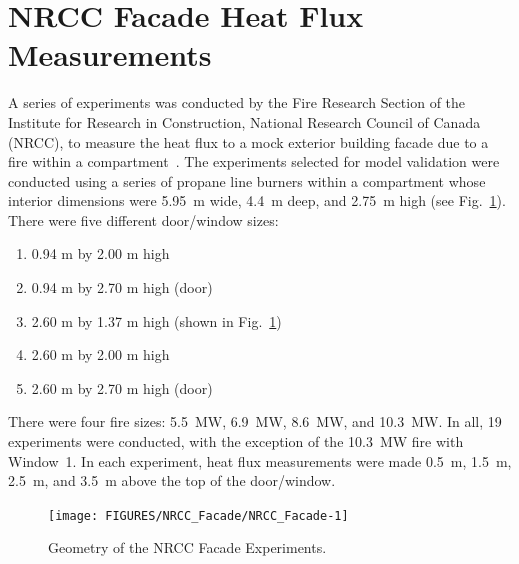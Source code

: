 \section{NRCC Facade Heat Flux Measurements}

A series of experiments was conducted by the Fire Research Section of the Institute for Research in Construction, National Research Council of Canada (NRCC),
to measure the heat flux to a mock exterior building facade due to a fire within a compartment~\cite{Oleszkiewicz:ASME,Oleszkiewicz:FireTech}. The experiments selected for model
validation were conducted using a series of propane line burners within a compartment whose interior dimensions were 5.95~m wide, 4.4~m deep, and 2.75~m high (see
Fig.~\ref{NRCC_Facade_Drawing}). There
were five different door/window sizes:
\begin{enumerate}
\item 0.94 m by 2.00 m high
\item 0.94 m by 2.70 m high (door)
\item 2.60 m by 1.37 m high (shown in Fig.~\ref{NRCC_Facade_Drawing})
\item 2.60 m by 2.00 m high
\item 2.60 m by 2.70 m high (door)
\end{enumerate}
There were four fire sizes: 5.5~MW, 6.9~MW, 8.6~MW, and 10.3~MW. In all, 19 experiments were conducted, with the exception of the 10.3~MW fire with Window~1. In each
experiment, heat flux measurements were made 0.5~m, 1.5~m, 2.5~m, and 3.5~m above the top of the door/window.

\begin{figure}
\begin{center}
\texttt{[image: FIGURES/NRCC\_Facade/NRCC\_Facade-1]}
\end{center}
\caption[Geometry of the NRCC Facade Experiments]{Geometry of the NRCC Facade Experiments.}
\label{NRCC_Facade_Drawing}
\end{figure}


\clearpage

